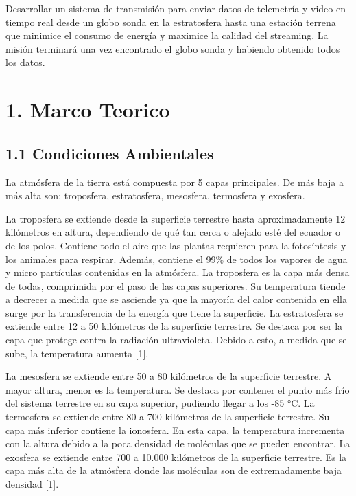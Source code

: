 \documentclass[12pt,a4paper]{article}
\begin{document}
Desarrollar un sistema de transmisión para enviar datos de telemetría y video en tiempo real desde un globo sonda en la estratosfera hasta una estación terrena que minimice el consumo de energía y maximice la calidad del streaming. La misión terminará una vez encontrado el globo sonda y habiendo obtenido todos los datos.

\subsection{}\label{section-4}

\section{\texorpdfstring{\textbf{1. Marco Teorico}}{1. Marco Teorico}}\label{marco-teorico}

\subsection{1.1 Condiciones Ambientales}\label{condiciones-ambientales}

La atmósfera de la tierra está compuesta por 5 capas principales. De más baja a más alta son: troposfera, estratosfera, mesosfera, termosfera y exosfera.

La troposfera se extiende desde la superficie terrestre hasta aproximadamente 12 kilómetros en altura, dependiendo de qué tan cerca o alejado esté del ecuador o de los polos. Contiene todo el aire que las plantas requieren para la fotosíntesis y los animales para respirar. Además, contiene el 99\% de todos los vapores de agua y micro partículas contenidas en la atmósfera. La troposfera es la capa más densa de todas, comprimida por el paso de las capas superiores. Su temperatura tiende a decrecer a medida que se asciende ya que la mayoría del calor contenida en ella surge por la transferencia de la energía que tiene la superficie. La estratosfera se extiende entre 12 a 50 kilómetros de la superficie terrestre. Se destaca por ser la capa que protege contra la radiación ultravioleta. Debido a esto, a medida que se sube, la temperatura aumenta {[}1{]}.

La mesosfera se extiende entre 50 a 80 kilómetros de la superficie terrestre. A mayor altura, menor es la temperatura. Se destaca por contener el punto más frío del sistema terrestre en su capa superior, pudiendo llegar a los -85 °C. La termosfera se extiende entre 80 a 700 kilómetros de la superficie terrestre. Su capa más inferior contiene la ionosfera. En esta capa, la temperatura incrementa con la altura debido a la poca densidad de moléculas que se pueden encontrar. La exosfera se extiende entre 700 a 10.000 kilómetros de la superficie terrestre. Es la capa más alta de la atmósfera donde las moléculas son de extremadamente baja densidad {[}1{]}.
\end{document}
